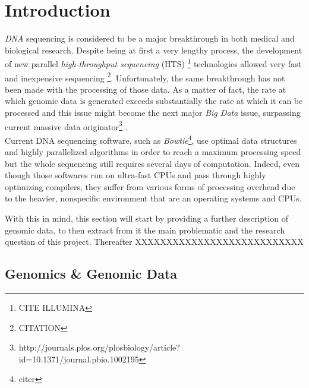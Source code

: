 
\chapter{Introduction} %

\label{Chapter1} %



\textit{DNA} sequencing is considered to be a major breakthrough in both medical and biological research. Despite being at first a very lengthy process, the development of new parallel \textit{high-throughput sequencing} (HTS) \footnote{CITE ILLUMINA} technologies allowed very fast and inexpensive sequencing \footnote{CITATION}. Unfortunately, the same breakthrough has not been made with the processing of those data. 
As a matter of fact, the rate at which genomic data is generated exceeds substantially the rate at which it can be processed and this issue might become the next major \textsl{Big Data} issue, surpassing current massive data originator\footnote{http://journals.plos.org/plosbiology/article?id=10.1371/journal.pbio.1002195} .\\

Current DNA sequencing software, such as \textit{Bowtie}\footnote{citer}, use optimal data structures and highly parallelized algorithms in order to reach a maximum processing speed but the whole sequencing still requires several days of computation. Indeed, even though those softwares run on ultra-fast CPUs and pass through highly optimizing compilers, they suffer from various forms of processing overhead due to the heavier, nonspecific environment that are an operating systems and CPUs.

With this in mind, this section will start by providing a further description of genomic data, to then extract from it the main problematic and the research question of this project. Thereafter XXXXXXXXXXXXXXXXXXXXXXXXXXX


\section{Genomics \& Genomic Data}

